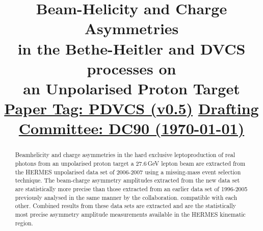 \documentclass{elsart}
\begin{document}
 \begin{frontmatter}

\title{
	Beam-Helicity and Charge Asymmetries \\
        in the Bethe-Heitler and DVCS processes on \\
        an Unpolarised Proton Target
  	\underline{Paper Tag: PDVCS (v0.5)}
        \underline{Drafting Committee: DC90 (\today)}
}

\begin{abstract}
Beam\blue{-}helicity and charge asymmetries in the hard exclusive leptoproduction of
real photons from an unpolarised proton target  a 27.6\,GeV lepton beam 
are extracted from the HERMES unpolarised data set of 2006-2007 using a
missing-mass event selection technique. The beam-charge asymmetry amplitudes extracted from the new data set are statistically more precise than those extracted from an earlier data set of 1996-2005 previously analysed in the same manner by the collaboration.  compatible with each other. Combined results from these data sets are extracted and are the statistically most precise asymmetry amplitude measurements available in the HERMES kinematic region.
\end{abstract}

\end{frontmatter}
% 
\setvruler[15pt][1][1][3][1][30pt][30pt][-42pt]








\end{document}
